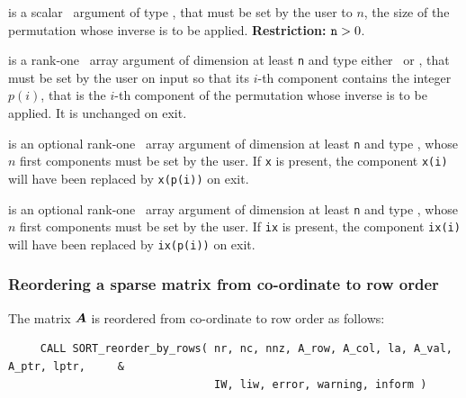 \documentclass{galahad}
\begin{document}
\begin{description}
 is a scalar \intentin\ argument of type
\integer, that must be set by the user to $n$, the size of the permutation
whose inverse is to be applied.
{\bf Restriction:} ${\tt n} > 0$.

 is a rank-one \intentinout\ array argument of
dimension at least {\tt n} and type either
\integer\ or \realdp, that must be set by the user
on input so that its $i$-th component contains the integer $p(i)$, that is the
$i$-th component of the permutation whose inverse is to be applied.
It is unchanged on exit.

 is an optional rank-one \intentinout\ array argument of
dimension at least {\tt n} and type \realdp, whose $n$ first components must
be set by the user. If {\tt x} is present, the component {\tt x(i)} will have
been replaced by {\tt x(p(i))} on exit.

 is an optional rank-one \intentinout\ array argument of
dimension at least {\tt n} and type \integer, whose $n$ first components must
be set by the user. If {\tt ix} is present, the component {\tt ix(i)} will have
been replaced by {\tt ix(p(i))} on exit.
\end{description}

\subsubsection{Reordering a sparse matrix from co-ordinate to row order}

The matrix ${\bm{A}}$ is reordered from co-ordinate to row order as follows:
\hskip0.5in
\def\baselinestretch{1.0} {\tt \begin{verbatim}
     CALL SORT_reorder_by_rows( nr, nc, nnz, A_row, A_col, la, A_val,  A_ptr, lptr,     &
                                IW, liw, error, warning, inform )
\end{verbatim}}
\def\baselinestretch{1.0}
\end{document}

